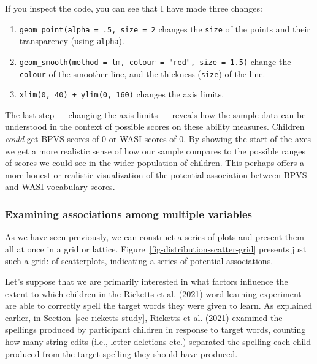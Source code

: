 \documentclass[
  letterpaper,
  DIV=11,
  numbers=noendperiod]{scrreprt}
\providecommand{\tightlist}{%
  \setlength{\itemsep}{0pt}\setlength{\parskip}{0pt}}\usepackage{longtable,booktabs,array}
\begin{document}
If you inspect the code, you can see that I have made three changes:

\begin{enumerate}
\def\labelenumi{\arabic{enumi}.}
\tightlist
\item
  \texttt{geom\_point(alpha\ =\ .5,\ size\ =\ 2} changes the
  \texttt{size} of the points and their transparency (using
  \texttt{alpha}).
\item
  \texttt{geom\_smooth(method\ =\ \textquotesingle{}lm\textquotesingle{},\ colour\ =\ "red",\ size\ =\ 1.5)}
  change the \texttt{colour} of the smoother line, and the thickness
  (\texttt{size}) of the line.
\item
  \texttt{xlim(0,\ 40)\ +\ ylim(0,\ 160)} changes the axis limits.
\end{enumerate}

The last step --- changing the axis limits --- reveals how the sample
data can be understood in the context of possible scores on these
ability measures. Children \emph{could} get BPVS scores of 0 or WASI
scores of 0. By showing the start of the axes we get a more realistic
sense of how our sample compares to the possible ranges of scores we
could see in the wider population of children. This perhaps offers a
more honest or realistic visualization of the potential association
between BPVS and WASI vocabulary scores.

\hypertarget{sec-scatter-analysis-multiple}{%
\subsubsection{Examining associations among multiple
variables}\label{sec-scatter-analysis-multiple}}

As we have seen previously, we can construct a series of plots and
present them all at once in a grid or lattice.
Figure~\ref{fig-distribution-scatter-grid} presents just such a grid: of
scatterplots, indicating a series of potential associations.

Let's suppose that we are primarily interested in what factors influence
the extent to which children in the Ricketts et al. (2021) word learning
experiment are able to correctly spell the target words they were given
to learn. As explained earlier, in Section~\ref{sec-ricketts-study},
Ricketts et al. (2021) examined the spellings produced by participant
children in response to target words, counting how many string edits
(i.e., letter deletions etc.) separated the spelling each child produced
from the target spelling they should have produced.
\end{document}
